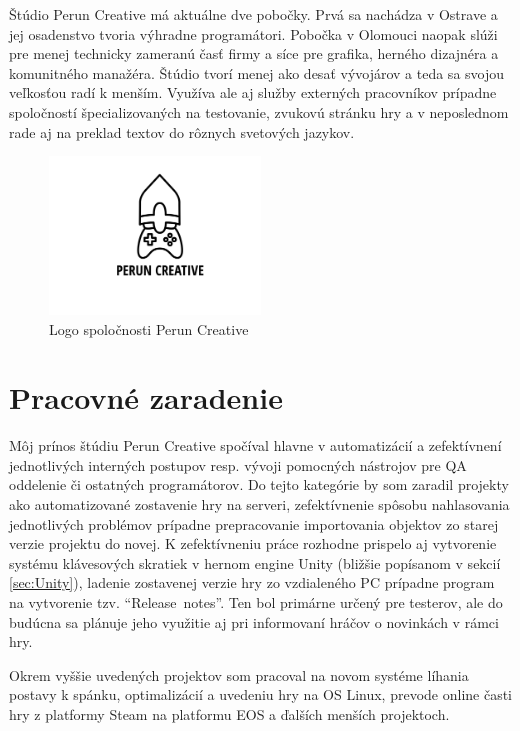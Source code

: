 \documentclass[slovak, bachelorpractice]{diploma}
\begin{document}
Štúdio Perun Creative má aktuálne dve pobočky. Prvá sa nachádza v Ostrave a jej osadenstvo tvoria výhradne programátori. Pobočka v Olomouci naopak slúži pre menej technicky zameranú časť firmy a síce pre grafika, herného dizajnéra a komunitného manažéra. Štúdio tvorí menej ako desať vývojárov a teda sa svojou veľkosťou radí k menším. Využíva ale aj služby externých pracovníkov prípadne spoločností špecializovaných na testovanie, zvukovú stránku hry a v neposlednom rade aj na preklad textov do rôznych svetových jazykov.
\vspace{-20pt}
\begin{figure}[!htbp]
	\centering
	\includegraphics[width=0.5\textwidth]{Pictures/perunLogo.pdf}
	\vspace{-35pt}
	\caption{Logo spoločnosti Perun Creative}
	\label{pic:perunLogo}
\end{figure}
\vspace{-20pt}
\section{Pracovné zaradenie}
\label{sec:Me}
Môj prínos štúdiu Perun Creative spočíval hlavne v automatizácií a zefektívnení jednotlivých interných postupov resp. vývoji pomocných nástrojov pre QA oddelenie či ostatných programátorov. Do tejto kategórie by som zaradil projekty ako automatizované zostavenie hry na serveri, zefektívnenie spôsobu nahlasovania jednotlivých problémov prípadne prepracovanie importovania objektov zo starej verzie projektu do novej. K zefektívneniu práce rozhodne prispelo aj vytvorenie systému klávesových skratiek v hernom engine Unity (bližšie popísanom v sekcií \ref{sec:Unity}), ladenie zostavenej verzie hry zo vzdialeného PC prípadne program na vytvorenie tzv. \mbox{\enquote{Release notes}}. Ten bol primárne určený pre testerov, ale do budúcna sa plánuje jeho využitie aj pri informovaní hráčov o novinkách v rámci hry.

Okrem vyššie uvedených projektov som pracoval na novom systéme líhania postavy k spánku, optimalizácií a uvedeniu hry na OS Linux, prevode online časti hry z platformy Steam na platformu EOS a ďalších menších projektoch.
\end{document}
